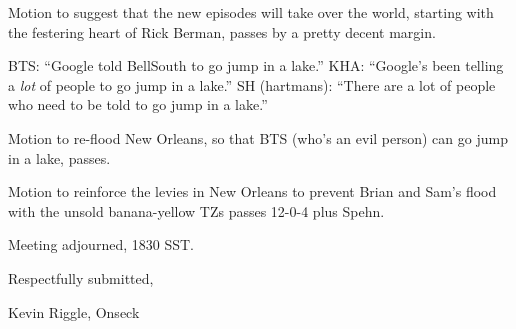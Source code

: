 \documentclass[10pt]{article}
\newcommand{\ps}{ plus Spehn\xspace}
\begin{document}
Motion to suggest that the new episodes will take over the world, starting with the festering heart
of Rick Berman, passes by a pretty decent margin.

BTS: ``Google told BellSouth to go jump in a lake.''
KHA: ``Google's been telling a \emph{lot} of people to go jump in a lake.''
SH (hartmans): ``There are a lot of people who need to be told to go jump in a lake.''

Motion to re-flood New Orleans, so that BTS (who's an evil person) can go jump in a lake, passes.

Motion to reinforce the levies in New Orleans to prevent Brian and Sam's flood with the unsold
banana-yellow TZs passes 12-0-4\ps.

\vspace{12pt}

\noindent
Meeting adjourned, 1830 SST.

\vspace{18pt}

\centerline{Respectfully submitted,}
\centerline{Kevin Riggle, Onseck}
\end{document}
